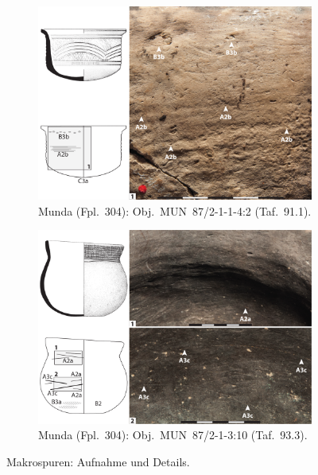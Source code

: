 \begin{multicols}{2}
\begin{figure}[p]
	\centering
	\begin{subfigure}{\textwidth}
		\centering
		\includegraphics[width = \textwidth]{fig/Abb_Macrotraces/MUN87-2-1-1-4-2.pdf}
		\caption{Munda (Fpl.~304): Obj.~MUN~87/2-1-1-4:2 (Taf.~91.1).\vspace{1em}}
		\label{MUN87-2-1-1-4-2_Makrospuren}
	\end{subfigure}
	\begin{subfigure}{\textwidth}
		\centering
		\includegraphics[width = \textwidth]{fig/Abb_Macrotraces/MUN87-2-1-3-10_Gef10.pdf}
		\caption{Munda (Fpl.~304): Obj.~MUN~87/2-1-3:10 (Taf.~93.3).}
		\label{MUN87-2-1-3-10_Makrospuren}
	\end{subfigure}
	\caption{Makrospuren: Aufnahme und Details.}
\end{figure}


\end{multicols}
